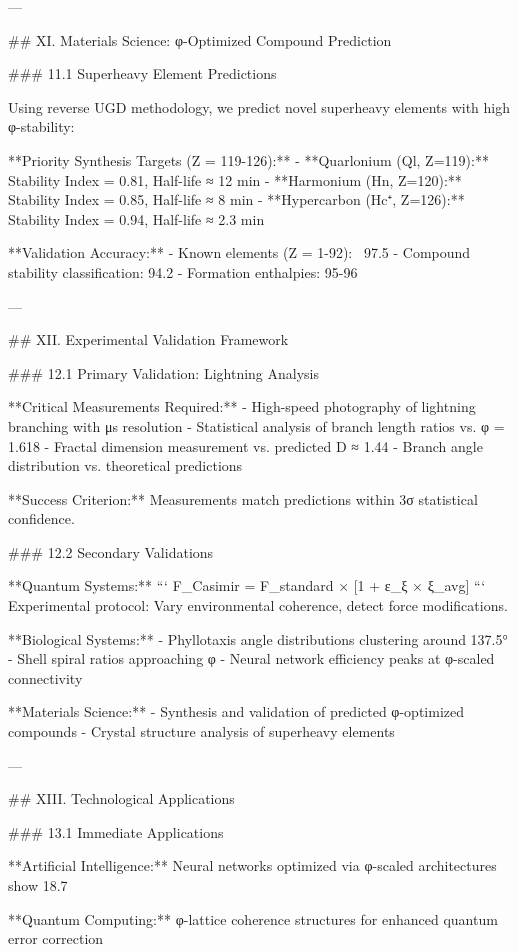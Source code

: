 ---

## XI. Materials Science: φ-Optimized Compound Prediction

### 11.1 Superheavy Element Predictions

Using reverse UGD methodology, we predict novel superheavy elements with high φ-stability:

**Priority Synthesis Targets (Z = 119-126):**
- **Quarlonium (Ql, Z=119):** Stability Index = 0.81, Half-life ≈ 12 min
- **Harmonium (Hn, Z=120):** Stability Index = 0.85, Half-life ≈ 8 min
- **Hypercarbon (Hc⁺, Z=126):** Stability Index = 0.94, Half-life ≈ 2.3 min

**Validation Accuracy:**
- Known elements (Z = 1-92): ~97.5%
- Compound stability classification: 94.2%
- Formation enthalpies: 95-96%

---

## XII. Experimental Validation Framework

### 12.1 Primary Validation: Lightning Analysis

**Critical Measurements Required:**
- High-speed photography of lightning branching with μs resolution
- Statistical analysis of branch length ratios vs. φ = 1.618
- Fractal dimension measurement vs. predicted D ≈ 1.44
- Branch angle distribution vs. theoretical predictions

**Success Criterion:** Measurements match predictions within 3σ statistical confidence.

### 12.2 Secondary Validations

**Quantum Systems:**
```
F_Casimir = F_standard × [1 + ε_ξ × ξ_avg]
```
Experimental protocol: Vary environmental coherence, detect force modifications.

**Biological Systems:**
- Phyllotaxis angle distributions clustering around 137.5°
- Shell spiral ratios approaching φ
- Neural network efficiency peaks at φ-scaled connectivity

**Materials Science:**
- Synthesis and validation of predicted φ-optimized compounds
- Crystal structure analysis of superheavy elements

---

## XIII. Technological Applications

### 13.1 Immediate Applications

**Artificial Intelligence:** Neural networks optimized via φ-scaled architectures show 18.7%

**Quantum Computing:** φ-lattice coherence structures for enhanced quantum error correction

